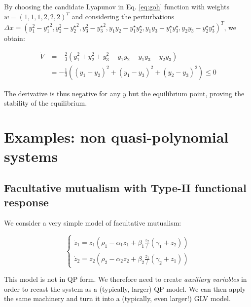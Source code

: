 \documentclass{article}
\begin{document}
By choosing the candidate Lyapunov in Eq. \ref{eq:goh} function with
weights \(w = (1,1,1, 2,2,2)^T\) and considering the perturbations
\(\Delta x = (y_1^2 - {y_1^\star}^2, y_2^2 - {y_2^\star}^2, y_3^2 - {y_3^\star}^2, y_1 y_2 - y_1^\star y_2^\star, y_1 y_3 - y_1^\star y_3^\star, y_2 y_3 - y_2^\star y_3^\star)^T\),
we obtain:

\begin{equation}
\begin{aligned}
\dot{V} &= -\frac{2}{3} \left(y_1^2 + y_2^2 + y_3^2 - y_1 y_2 -y_1 y_3 - y_2 y_3 \right) \\
&=-\frac{1}{3} \left((y_1 - y_2)^2 + (y_1 - y_3)^2 + (y_2 - y_3)^2\right) \leq 0
\end{aligned}
\end{equation}

The derivative is thus negative for any \(y\) but the equilibrium point,
proving the stability of the equilibrium.

\hypertarget{examples-non-quasi-polynomial-systems}{%
\section{Examples: non quasi-polynomial
systems}\label{examples-non-quasi-polynomial-systems}}

\hypertarget{facultative-mutualism-with-type-ii-functional-response}{%
\subsection{Facultative mutualism with Type-II functional
response}\label{facultative-mutualism-with-type-ii-functional-response}}

We consider a very simple model of facultative mutualism:

\begin{equation}
\begin{cases}
\dot{z}_1 = z_1 \left(\rho_1 - \alpha_1 z_1 + \beta_1 \frac{z_2} / (\gamma_1 + z_2) \right)\\
\dot{z}_2 = z_2 \left(\rho_2 - \alpha_2 z_2 + \beta_2 \frac{z_1} / (\gamma_2 + z_1) \right)
\end{cases}
\end{equation}

This model is not in QP form. We therefore need to create
\emph{auxiliary variables} in order to recast the system as a
(typically, larger) QP model. We can then apply the same machinery and
turn it into a (typically, even larger!) GLV model.
\end{document}

